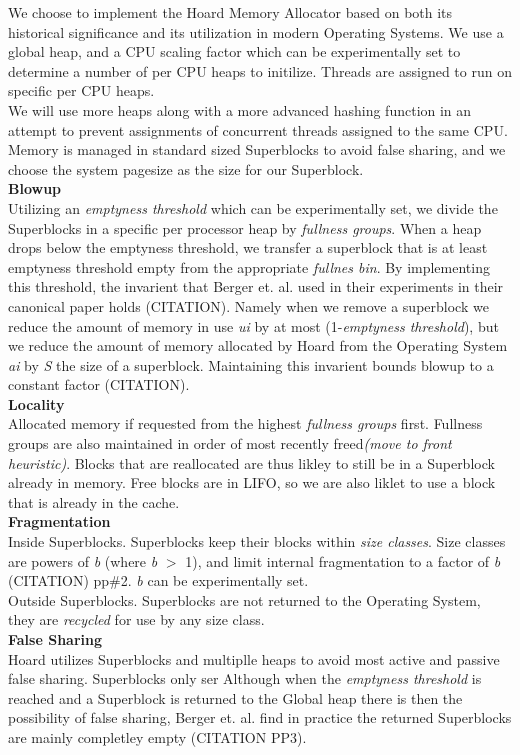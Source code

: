 \documentclass[11pt]{article}
\begin{document}
\indent \indent We choose to implement the Hoard Memory Allocator based on both its historical significance and its utilization in modern Operating Systems.  We use a global heap, and a CPU scaling factor which can be experimentally set to determine a number of per CPU heaps to initilize.  Threads are assigned to run on specific per CPU heaps.  
\\
\indent We will use more heaps along with a more advanced hashing function in an attempt to prevent assignments of concurrent threads assigned to the same CPU.  Memory is managed in standard sized Superblocks to avoid false sharing, and we choose the system pagesize as the size for our Superblock.
\\
\newpage
\noindent
\textbf{Blowup}
\\
\indent  Utilizing an \textit{emptyness threshold} which can be experimentally set, we divide the Superblocks in a specific per processor heap by \textit{fullness groups}.  When a heap drops below the emptyness threshold, we transfer a superblock that is at least emptyness threshold empty from the appropriate \textit{fullnes bin}.  By implementing this threshold, the invarient that Berger et. al. used in their experiments in their canonical paper holds (CITATION).  Namely when we remove a superblock we reduce the amount of memory in use \textit{ui} by at most (1-\textit{emptyness threshold}), but we reduce the amount of memory allocated by Hoard from the Operating System \textit{ai} by \textit{S} the size of a superblock.   Maintaining this invarient bounds blowup to a constant factor (CITATION).  
\\
\textbf{Locality}
\\
\indent Allocated memory if requested from the highest \textit{fullness groups} first.  Fullness groups are also maintained in order of most recently freed\textit{(move to front heuristic)}.  Blocks that are reallocated are thus likley to still be in a Superblock already in memory.  Free blocks are in LIFO, so we are also liklet to use a block that is already in the cache.
\\
\textbf{Fragmentation}
\\
\indent Inside Superblocks.  Superblocks keep their blocks within \textit{size classes}.  Size classes are powers of \textit{b} (where \textit{b} $>$ 1), and limit internal fragmentation to a factor of \textit{b} (CITATION) pp\#2. \textit{b} can be experimentally set.  
\\
\indent Outside Superblocks.  Superblocks are not returned to the Operating System, they are \textit{recycled} for use by any size class.
\\
\textbf{False Sharing}
\\
\indent Hoard utilizes Superblocks and multiplle heaps to avoid most active and passive false sharing.   Superblocks only ser   Although when the \textit{emptyness threshold} is reached and a Superblock is returned to the Global heap there is then the possibility of false sharing, Berger et. al. find in practice the returned Superblocks are mainly completley empty (CITATION PP3).
\end{document}
